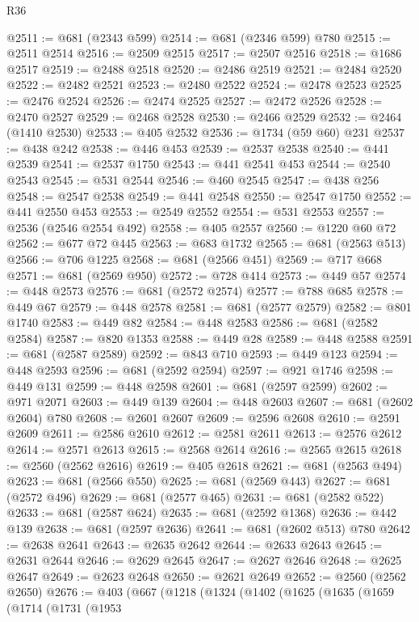 \begin{lexlean}{R36}
\begin{coremodule}
{{{{{{{{{{{{{{{{{{{{{{{{{{{{{{{{{{{{{{{{{{{{{{{{{{{{{{{{{{{{{{{{{{{{{{{{{{{{{{{{{{@2511 := @681 (@2343 @599)
@2514 := @681 (@2346 @599) @780
@2515 := @2511 @2514
@2516 := @2509 @2515
@2517 := @2507 @2516
@2518 := @1686 @2517
@2519 := @2488 @2518
@2520 := @2486 @2519
@2521 := @2484 @2520
@2522 := @2482 @2521
@2523 := @2480 @2522
@2524 := @2478 @2523
@2525 := @2476 @2524
@2526 := @2474 @2525
@2527 := @2472 @2526
@2528 := @2470 @2527
@2529 := @2468 @2528
@2530 := @2466 @2529
@2532 := @2464 (@1410 @2530)
@2533 := @405 @2532
@2536 := @1734 (@59 @60) @231
@2537 := @438 @242
@2538 := @446 @453
@2539 := @2537 @2538
@2540 := @441 @2539
@2541 := @2537 @1750
@2543 := @441 @2541 @453
@2544 := @2540 @2543
@2545 := @531 @2544
@2546 := @460 @2545
@2547 := @438 @256
@2548 := @2547 @2538
@2549 := @441 @2548
@2550 := @2547 @1750
@2552 := @441 @2550 @453
@2553 := @2549 @2552
@2554 := @531 @2553
@2557 := @2536 (@2546 @2554 @492)
@2558 := @405 @2557
@2560 := @1220 @60 @72
@2562 := @677 @72 @445
@2563 := @683 @1732
@2565 := @681 (@2563 @513)
@2566 := @706 @1225
@2568 := @681 (@2566 @451)
@2569 := @717 @668
@2571 := @681 (@2569 @950)
@2572 := @728 @414
@2573 := @449 @57
@2574 := @448 @2573
@2576 := @681 (@2572 @2574)
@2577 := @788 @685
@2578 := @449 @67
@2579 := @448 @2578
@2581 := @681 (@2577 @2579)
@2582 := @801 @1740
@2583 := @449 @82
@2584 := @448 @2583
@2586 := @681 (@2582 @2584)
@2587 := @820 @1353
@2588 := @449 @28
@2589 := @448 @2588
@2591 := @681 (@2587 @2589)
@2592 := @843 @710
@2593 := @449 @123
@2594 := @448 @2593
@2596 := @681 (@2592 @2594)
@2597 := @921 @1746
@2598 := @449 @131
@2599 := @448 @2598
@2601 := @681 (@2597 @2599)
@2602 := @971 @2071
@2603 := @449 @139
@2604 := @448 @2603
@2607 := @681 (@2602 @2604) @780
@2608 := @2601 @2607
@2609 := @2596 @2608
@2610 := @2591 @2609
@2611 := @2586 @2610
@2612 := @2581 @2611
@2613 := @2576 @2612
@2614 := @2571 @2613
@2615 := @2568 @2614
@2616 := @2565 @2615
@2618 := @2560 (@2562 @2616)
@2619 := @405 @2618
@2621 := @681 (@2563 @494)
@2623 := @681 (@2566 @550)
@2625 := @681 (@2569 @443)
@2627 := @681 (@2572 @496)
@2629 := @681 (@2577 @465)
@2631 := @681 (@2582 @522)
@2633 := @681 (@2587 @624)
@2635 := @681 (@2592 @1368)
@2636 := @442 @139
@2638 := @681 (@2597 @2636)
@2641 := @681 (@2602 @513) @780
@2642 := @2638 @2641
@2643 := @2635 @2642
@2644 := @2633 @2643
@2645 := @2631 @2644
@2646 := @2629 @2645
@2647 := @2627 @2646
@2648 := @2625 @2647
@2649 := @2623 @2648
@2650 := @2621 @2649
@2652 := @2560 (@2562 @2650)
@2676 := @403
    (@667
      (@1218
        (@1324
          (@1402
            (@1625
              (@1635
                (@1659
                  (@1714
                    (@1731
                      (@1953
}}}}}}}}}}}}}}}}}}}}}}}}}}}}}}}}}}}}}}}}}}}}}}}}}}}}}}}}}}}}}}}}}}}}}}}}}}}}}}}}}}
\end{coremodule}
\end{lexlean}
